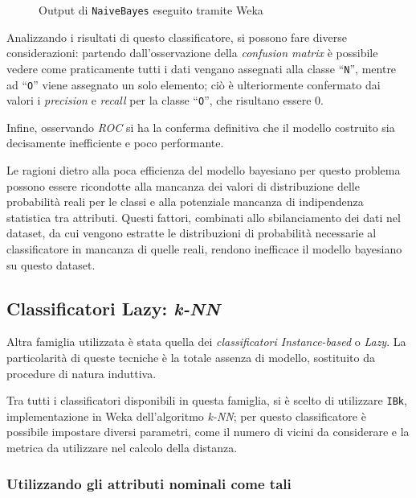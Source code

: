 \begin{figure}[H]
  \centering
  \caption{Output di \texttt{NaiveBayes} eseguito tramite Weka}%
  \label{fig:bayes}
\end{figure}

Analizzando i risultati di questo classificatore, si possono fare diverse considerazioni:
partendo dall'osservazione della \emph{confusion matrix} è possibile vedere come praticamente tutti i dati vengano assegnati alla classe ``\texttt{N}'', mentre ad ``\texttt{O}'' viene assegnato un solo elemento;
ciò è ulteriormente confermato dai valori i \emph{precision} e \emph{recall} per la classe ``\texttt{O}'', che risultano essere \(0\).

Infine, osservando \emph{ROC} si ha la conferma definitiva che il modello costruito sia decisamente inefficiente e poco performante.

Le ragioni dietro alla poca efficienza del modello bayesiano per questo problema possono essere ricondotte alla mancanza dei valori di distribuzione delle probabilità reali per le classi e alla potenziale mancanza di indipendenza statistica tra attributi.
Questi fattori, combinati allo sbilanciamento dei dati nel dataset, da cui vengono estratte le distribuzioni di probabilità necessarie al classificatore in mancanza di quelle reali, rendono inefficace il modello bayesiano su questo dataset.

\subsection{Classificatori Lazy: \emph{k-NN}}\label{subsec:ibk}

Altra famiglia utilizzata è stata quella dei \emph{classificatori Instance-based} o \emph{Lazy}.
La particolarità di queste tecniche è la totale assenza di modello, sostituito da procedure di natura induttiva.

Tra tutti i classificatori disponibili in questa famiglia, si è scelto di utilizzare \texttt{IBk}, implementazione in Weka dell'algoritmo \emph{k-NN};
per questo classificatore è possibile impostare diversi parametri, come il numero di vicini da considerare e la metrica da utilizzare nel calcolo della distanza.

\subsubsection{Utilizzando gli attributi nominali come tali}\label{subsub:ibk:nominal}

